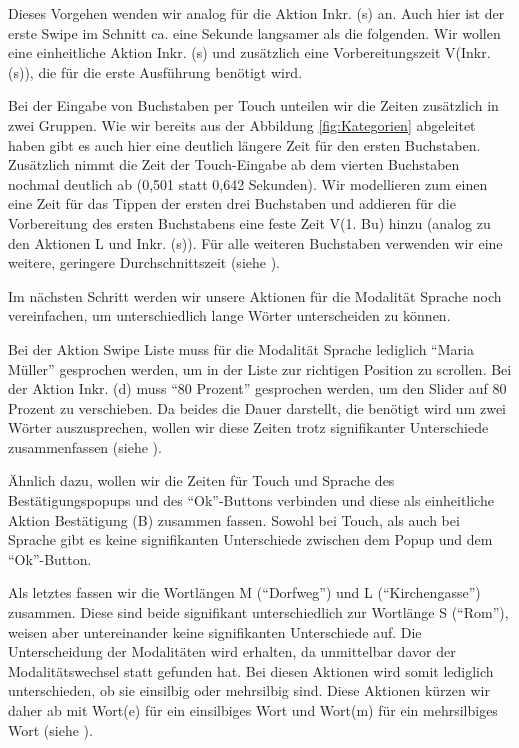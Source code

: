 Dieses Vorgehen wenden wir analog für die Aktion Inkr. (s) an.
Auch hier ist der erste Swipe im Schnitt ca. eine Sekunde langsamer als die folgenden.
Wir wollen eine einheitliche Aktion Inkr. (s) und zusätzlich eine Vorbereitungszeit V(Inkr. (s)), die für die erste Ausführung benötigt wird.
 
Bei der Eingabe von Buchstaben per Touch unteilen wir die Zeiten zusätzlich in zwei Gruppen.
Wie wir bereits aus der Abbildung \ref{fig:Kategorien} abgeleitet haben gibt es auch hier eine deutlich längere Zeit für den ersten Buchstaben.
Zusätzlich nimmt die Zeit der Touch-Eingabe ab dem vierten Buchstaben nochmal deutlich ab (0,501 statt 0,642 Sekunden).
Wir modellieren zum einen eine Zeit für das Tippen der ersten drei Buchstaben und addieren für die Vorbereitung des ersten Buchstabens eine feste Zeit V(1. Bu) hinzu (analog zu den Aktionen L und Inkr. (s)).
Für alle weiteren Buchstaben verwenden wir eine weitere, geringere Durchschnittszeit (siehe ).

Im nächsten Schritt werden wir unsere Aktionen für die Modalität Sprache noch vereinfachen, um unterschiedlich lange Wörter unterscheiden zu können.

Bei der Aktion Swipe Liste muss für die Modalität Sprache lediglich "`Maria Müller"' gesprochen werden, um in der Liste zur richtigen Position zu scrollen.
Bei der Aktion Inkr. (d) muss "`80 Prozent"' gesprochen werden, um den Slider auf 80 Prozent zu verschieben.
Da beides die Dauer darstellt, die benötigt wird um zwei Wörter auszusprechen, wollen wir diese Zeiten trotz signifikanter Unterschiede zusammenfassen (siehe ).

Ähnlich dazu, wollen wir die Zeiten für Touch und Sprache des Bestätigungspopups und des "`Ok"'-Buttons verbinden und diese als einheitliche Aktion Bestätigung (B) zusammen fassen.
Sowohl bei Touch, als auch bei Sprache gibt es keine signifikanten Unterschiede zwischen dem Popup und dem "`Ok"'-Button.

Als letztes fassen wir die Wortlängen M ("`Dorfweg"') und L ("`Kirchengasse"') zusammen.
Diese sind beide signifikant unterschiedlich zur Wortlänge S ("`Rom"'), weisen aber untereinander keine signifikanten Unterschiede auf.
Die Unterscheidung der Modalitäten wird erhalten, da unmittelbar davor der Modalitätswechsel statt gefunden hat.
Bei diesen Aktionen wird somit lediglich unterschieden, ob sie einsilbig oder mehrsilbig sind.
Diese Aktionen kürzen wir daher ab mit Wort(e) für ein einsilbiges Wort und Wort(m) für ein mehrsilbiges Wort (siehe ).

